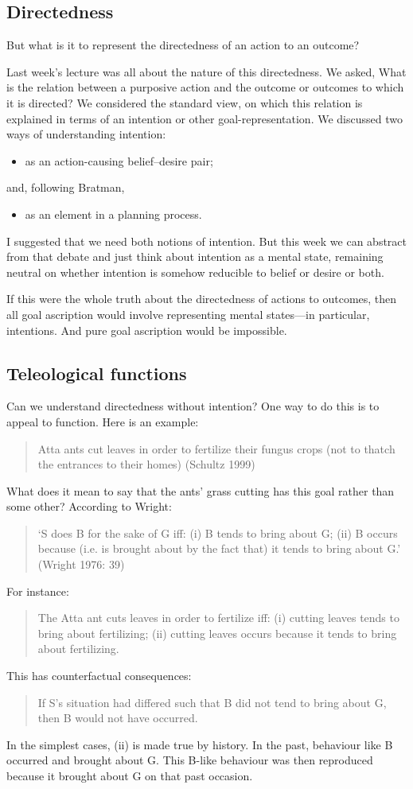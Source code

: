 \documentclass[12pt,\papersize]{extarticle}
\begin{document}
\subsection{Directedness}
But what is it to represent the directedness of an action to an outcome?

Last week's lecture was all about the nature of this directedness. 
We asked, What is the relation between a purposive action and the outcome or outcomes to which it is directed?
We considered the standard view, on which this relation is explained in terms of an intention or other goal-representation.
We discussed two ways of understanding intention:
\begin{itemize}
\item as an action-causing belief--desire pair;
\end{itemize}
and, following Bratman,
\begin{itemize}
\item as an element in a planning process.
\end{itemize}
I suggested that we need both notions of intention.
But this week we can abstract from that debate and just think about intention as a mental state, remaining neutral on whether intention is somehow reducible to belief or desire or both.

If this were the whole truth about the directedness of actions to outcomes, then all goal ascription would involve representing mental states---in particular, intentions.
And pure goal ascription would be impossible.

\subsection{Teleological functions}
Can we understand directedness without intention?
One way to do this is to appeal to function.
Here is an example:
%
\begin{quote}
Atta ants cut leaves in order to fertilize their fungus crops (not to thatch the entrances to their homes) (Schultz 1999)
\end{quote}
%
What does it mean to say that the ants’ grass cutting has this goal rather than some other? According to Wright:
\begin{quote}
`S does B for the sake of G iff: (i) B tends to bring about G; (ii) B occurs because (i.e. is brought about by the fact that) it tends to bring about G.' (Wright 1976: 39)
\end{quote}
%
For instance:
%
\begin{quote}
The Atta ant cuts leaves in order to fertilize iff: (i) cutting leaves tends to bring about fertilizing; (ii) cutting leaves occurs because it tends to bring about fertilizing.
\end{quote}
%
This has counterfactual consequences:
\begin{quote}
If S’s situation had differed such that B did not tend to bring about G, then B would not have occurred.
\end{quote}
%
In the simplest cases, (ii) is made true by history. In the past, behaviour like B occurred and brought about G. This B-like behaviour was then reproduced because it brought about G on that past occasion.
\end{document}
